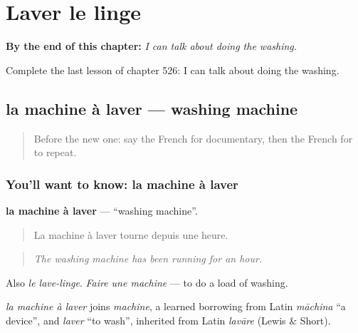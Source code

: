 
\chapter{Laver le linge}
\label{ch:fr-laver-le-linge}

\begin{chapteropening}
\textbf{By the end of this chapter:} \emph{I can talk about doing the washing.}

Complete the last lesson of chapter 526: I can talk about doing the washing.
\end{chapteropening}

\section[la machine à laver]{la machine à laver — washing machine}

\label{lesson:FR-C526-machine-a-laver}



\begin{quote}
Before the new one: say the French for documentary, then the French for to repeat.
\end{quote}

\subsection*{You'll want to know: la machine à laver}
\textbf{la machine à laver} — \textquotedblleft{}washing machine\textquotedblright{}.

\begin{quote}
La machine à laver tourne depuis une heure.
\end{quote}

\begin{quote}
\emph{The washing machine has been running for an hour.}
\end{quote}

Also \emph{le lave-linge}. \emph{Faire une machine} — to do a load of washing.

\begin{cousinweb}
\emph{la machine à laver} joins \emph{machine}, a learned borrowing from Latin \emph{māchina} \textquotedblleft{}a device\textquotedblright{}, and \emph{laver} \textquotedblleft{}to wash\textquotedblright{}, inherited from Latin \emph{lavāre} (Lewis \& Short).
\end{cousinweb}

